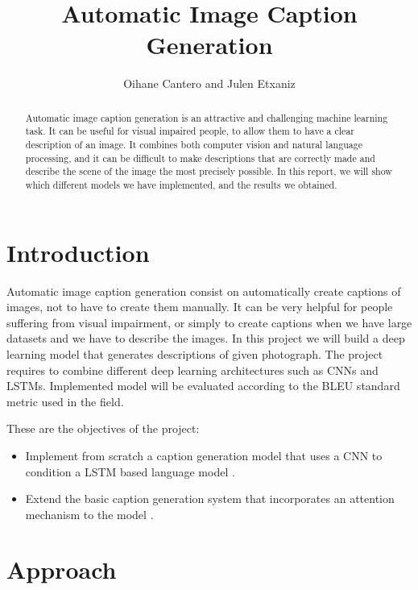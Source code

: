 \documentclass{article} %
\title{Automatic Image Caption Generation}
\author{Oihane Cantero and Julen Etxaniz}
\begin{document}
\maketitle

\begin{abstract}

Automatic image caption generation is an attractive and challenging machine learning task. It can be useful for visual impaired people, to allow them to have a clear description of an image. It combines both computer vision and natural language processing, and it can be difficult to make descriptions that are correctly made and describe the scene of the image the most precisely possible. In this report, we will show which different models we have implemented, and the results we obtained.

\end{abstract}

\tableofcontents

\newpage

\section{Introduction} \label{intro}

Automatic image caption generation consist on automatically create captions of images, not to have to create them manually. It can be very helpful for people suffering from visual impairment, or simply to create captions when we have large datasets and we have to describe the images.
In this project we will build a deep learning model that generates descriptions of given photograph. The project requires to combine different deep learning architectures such as CNNs and LSTMs. Implemented model will be evaluated according to the BLEU standard metric used in the field.

These are the objectives of the project:

\begin{itemize}
    \item Implement from scratch a caption generation model that uses a CNN to condition a LSTM based language model \cite{ShowTell}. 
    \item Extend the basic caption generation system that incorporates an attention mechanism to the model \cite{ShowAttendTell}. 
\end{itemize}

\section{Approach}
\end{document}

